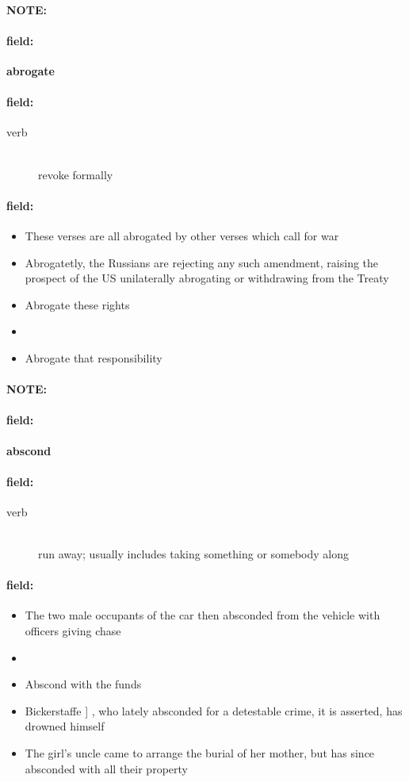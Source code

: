 \documentclass[12pt]{article}
\newenvironment{note}{\paragraph{NOTE:}}{}
\newenvironment{field}{\paragraph{field:}}{}
\begin{document}
\begin{note}
\begin{field}
\textbf{\large abrogate}
\end{field}


\begin{field}
\begin{description}
\item[verb] \hfill \\ 
revoke formally

\end{description}
\end{field}

\begin{field}
\begin{itemize}
\item These verses are all abrogated by other verses which call for war
\item Abrogatetly, the Russians are rejecting any such amendment, raising the prospect of the US unilaterally abrogating or withdrawing from the Treaty
\item Abrogate these rights
\item 
\item Abrogate that responsibility
\end{itemize}
\end{field}
\end{note}
\begin{note}
\begin{field}
\textbf{\large abscond}
\end{field}


\begin{field}
\begin{description}
\item[verb] \hfill \\ 
run away; usually includes taking something or somebody along

\end{description}
\end{field}

\begin{field}
\begin{itemize}
\item The two male occupants of the car then absconded from the vehicle with officers giving chase
\item 
\item Abscond with the funds
\item Bickerstaffe ] , who lately absconded for a detestable crime, it is asserted, has drowned himself
\item The girl's uncle came to arrange the burial of her mother, but has since absconded with all their property
\end{itemize}
\end{field}
\end{note}
\end{document}
